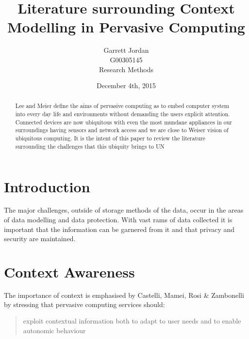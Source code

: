 \documentclass[]{report}
\title{Literature surrounding Context Modelling in Pervasive Computing}
\author{Garrett Jordan\\G00305145\\Research Methods}
\date{December 4th, 2015}
\begin{document}
\maketitle


% 
%

\begin{abstract}
Lee and Meier define the aims of pervasive computing as to embed computer system into every day life and environments without demanding the users explicit attention\cite{0}. Connected devices are now ubiquitous with even the most mundane appliances in our surroundings having sensors and network access and we are close to Weiser vision of ubiquitous computing\cite{1}. It is the intent of this paper to review the literature surrounding the challenges that this ubiquity brings to UN
\end{abstract}

% 
%

\section*{Introduction}
The major challenges, outside of storage methods of the data, occur in the areas of data modelling and data protection. With vast rams of data collected it is important that the information can be garnered from it and that privacy and security are maintained.\\

% 
%

\section*{Context Awareness}
The importance of context is emphasised by Castelli, Mamei, Rosi \& Zambonelli by stressing that  pervasive computing services should:
\begin{quote}
exploit contextual information both to adapt to user needs and to enable autonomic behaviour\cite{2}
\end{quote} 
\end{document}
